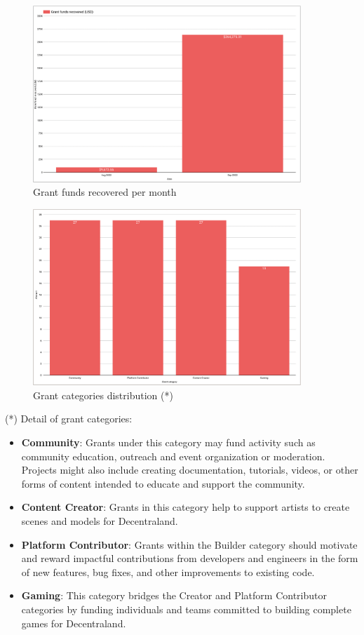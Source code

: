 \documentclass[MSE,Master,english]{twbook}%
\begin{document}
\begin{figure}[H]
  \centering
  \includegraphics[width=0.9\textwidth]{metrics/funds_recovered.png}
  \caption{Grant funds recovered per month}
  \label{fig:funds_recovered}
\end{figure}
\begin{figure}[H]
  \centering
  \includegraphics[width=0.9\textwidth]{metrics/category_distribution.png}
  \caption{Grant categories distribution (*)}
  \label{fig:category_distribution}
\end{figure}

(*) Detail of grant categories\cite{grants}:
\begin{itemize}
  \item \textbf{Community}: Grants under this category may fund activity such as community education, outreach and event organization or moderation. Projects might also include creating documentation, tutorials, videos, or other forms of content intended to educate and support the community.
  \item \textbf{Content Creator}: Grants in this category help to support artists to create scenes and models for Decentraland.
  \item \textbf{Platform Contributor}: Grants within the Builder category should motivate and reward impactful contributions from developers and engineers in the form of new features, bug fixes, and other improvements to existing code.
  \item \textbf{Gaming}: This category bridges the Creator and Platform Contributor categories by funding individuals and teams committed to building complete games for Decentraland.
\end{itemize}
\end{document}
